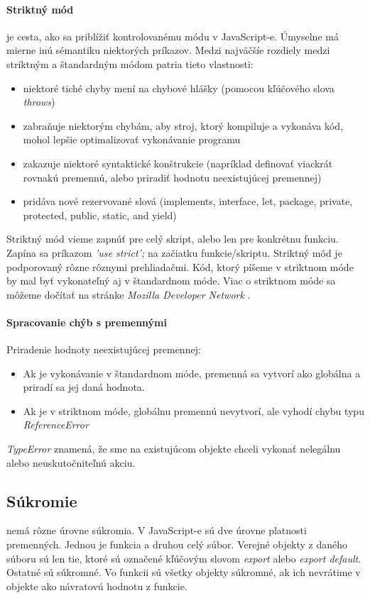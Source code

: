 \paragraph{Striktný mód} je cesta, ako sa priblížiť kontrolovanému módu v JavaScript-e. Úmyselne má mierne inú sémantiku niektorých príkazov. Medzi najväčšíe rozdiely medzi striktným a štandardným módom patria tieto vlastnosti:
\begin{itemize}
  \item niektoré tiché chyby mení na chybové hlášky (pomocou kľúčového slova \emph{throws})
  \item zabraňuje niektorým chybám, aby stroj, ktorý kompiluje a vykonáva kód, mohol lepšie optimalizovať vykonávanie programu
  \item zakazuje niektoré syntaktické konštrukcie (napríklad definovať viackrát rovnakú premennú, alebo priradiť hodnotu neexistujúcej premennej)
  \item pridáva nové rezervované slová (implements, interface, let, package, private, protected, public, static, and yield)
\end{itemize}

Striktný mód vieme zapnúť pre celý skript, alebo len pre konkrétnu funkciu. Zapína sa príkazom \emph{'use strict';} na začiatku funkcie/skriptu.
Striktný mód je podporovaný rôzne rôznymi prehliadačmi. Kód, ktorý píšeme v striktnom móde by mal byť vykonateľný aj v štandardnom móde. Viac o striktnom móde sa môžeme dočítať na stránke \emph{Mozilla Developer Network} \cite{strict}.

\paragraph{Spracovanie chýb s premennými\\}
Priradenie hodnoty neexistujúcej premennej:
\begin{itemize}
\item Ak je vykonávanie v štandardnom móde, premenná sa vytvorí ako globálna a priradí sa jej daná hodnota.
\item Ak je v striktnom móde, globálnu premennú nevytvorí, ale vyhodí chybu typu \emph{ReferenceError}
\end{itemize}

\emph{TypeError} znamená, že sme na existujúcom objekte chceli vykonať nelegálnu alebo neuskutočniteľnú akciu.

\subsection{Súkromie}
\JS{} nemá rôzne úrovne súkromia. V JavaScript-e sú dve úrovne platnosti premenných. Jednou je funkcia a druhou celý súbor. Verejné objekty z daného súboru sú len tie, ktoré sú označené kľúčovým slovom \emph{export} alebo \emph{export default}. Ostatné sú súkromné. Vo funkcii sú všetky objekty súkromné, ak ich nevrátime v objekte ako návratovú hodnotu z funkcie.

